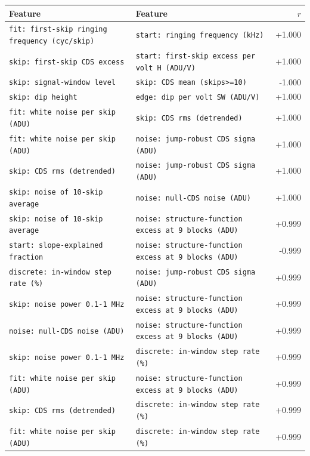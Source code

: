 \documentclass[10pt]{article}
\renewcommand{\_}{\oldunderscore\allowbreak}
\begin{document}
\begin{longtable}{>{\raggedright\arraybackslash}p{}>{\raggedright\arraybackslash}p{}r}
\toprule Feature & Feature & $r$ \\ \midrule \endhead
\bottomrule \endfoot
\texttt{fit: first-skip ringing frequency (cyc/skip)} & \texttt{start: ringing frequency (kHz)} & +1.000 \\
\texttt{skip: first-skip CDS excess} & \texttt{start: first-skip excess per volt H (ADU/V)} & +1.000 \\
\texttt{skip: signal-window level} & \texttt{skip: CDS mean (skips\textgreater{}=10)} & -1.000 \\
\texttt{skip: dip height} & \texttt{edge: dip per volt SW (ADU/V)} & +1.000 \\
\texttt{fit: white noise per skip (ADU)} & \texttt{skip: CDS rms (detrended)} & +1.000 \\
\texttt{fit: white noise per skip (ADU)} & \texttt{noise: jump-robust CDS sigma (ADU)} & +1.000 \\
\texttt{skip: CDS rms (detrended)} & \texttt{noise: jump-robust CDS sigma (ADU)} & +1.000 \\
\texttt{skip: noise of 10-skip average} & \texttt{noise: null-CDS noise (ADU)} & +1.000 \\
\texttt{skip: noise of 10-skip average} & \texttt{noise: structure-function excess at 9 blocks (ADU)} & +0.999 \\
\texttt{start: slope-explained fraction} & \texttt{noise: structure-function excess at 9 blocks (ADU)} & -0.999 \\
\texttt{discrete: in-window step rate (\%)} & \texttt{noise: jump-robust CDS sigma (ADU)} & +0.999 \\
\texttt{skip: noise power 0.1-1 MHz} & \texttt{noise: structure-function excess at 9 blocks (ADU)} & +0.999 \\
\texttt{noise: null-CDS noise (ADU)} & \texttt{noise: structure-function excess at 9 blocks (ADU)} & +0.999 \\
\texttt{skip: noise power 0.1-1 MHz} & \texttt{discrete: in-window step rate (\%)} & +0.999 \\
\texttt{fit: white noise per skip (ADU)} & \texttt{noise: structure-function excess at 9 blocks (ADU)} & +0.999 \\
\texttt{skip: CDS rms (detrended)} & \texttt{discrete: in-window step rate (\%)} & +0.999 \\
\texttt{fit: white noise per skip (ADU)} & \texttt{discrete: in-window step rate (\%)} & +0.999 \\

\end{longtable}
\end{document}
